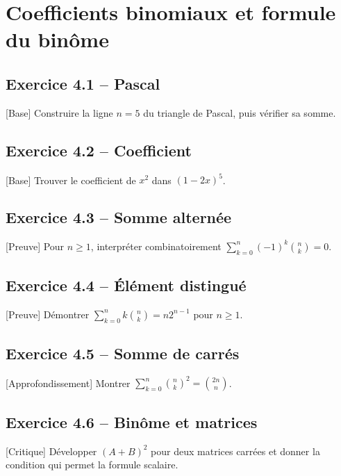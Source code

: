 \chapter{Coefficients binomiaux et formule du binôme}
\section*{Exercice 4.1 -- Pascal}
[Base] Construire la ligne $n=5$ du triangle de Pascal, puis vérifier sa somme.

\section*{Exercice 4.2 -- Coefficient}
[Base] Trouver le coefficient de $x^2$ dans $(1-2x)^5$.

\section*{Exercice 4.3 -- Somme alternée}
[Preuve] Pour $n\ge1$, interpréter combinatoirement $\sum_{k=0}^n(-1)^k\binom nk=0$.

\section*{Exercice 4.4 -- Élément distingué}
[Preuve] Démontrer $\sum_{k=0}^n k\binom nk=n2^{n-1}$ pour $n\ge1$.

\section*{Exercice 4.5 -- Somme de carrés}
[Approfondissement] Montrer $\sum_{k=0}^n\binom nk^2=\binom{2n}n$.

\section*{Exercice 4.6 -- Binôme et matrices}
[Critique] Développer $(A+B)^2$ pour deux matrices carrées et donner la condition qui permet la formule scalaire.
